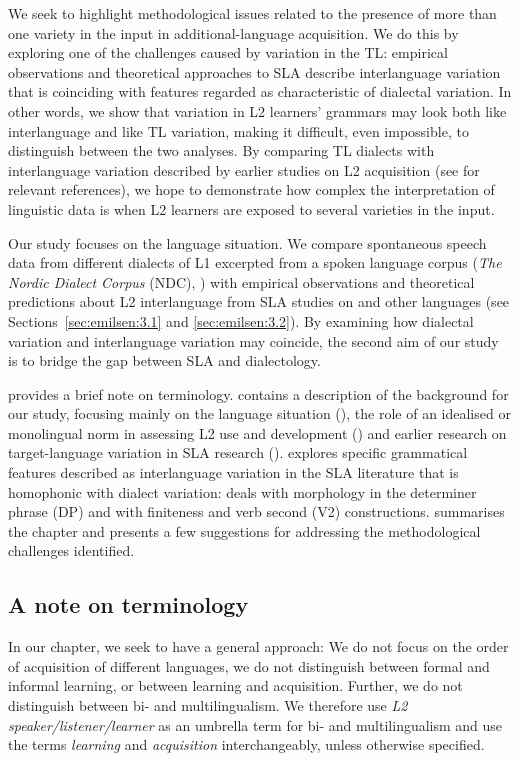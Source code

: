 \documentclass[output=paper,colorlinks,citecolor=brown,modfonts,nonflat]{../langscibook}
\begin{document}
We seek to highlight methodological issues related to the presence of more than one variety in the input in additional-language acquisition. We do this by exploring one of the challenges caused by variation in the TL: empirical observations and theoretical approaches to SLA describe interlanguage variation that is coinciding with features regarded as characteristic of dialectal variation. In other words, we show that variation in L2 learners’ grammars may look both like interlanguage and like TL variation, making it difficult, even impossible, to distinguish between the two analyses. By comparing TL dialects with interlanguage variation described by earlier studies on L2 acquisition (see  for relevant references), we hope to demonstrate how complex the interpretation of linguistic data is when L2 learners are exposed to several varieties in the input. 



Our study focuses on the  language situation. We compare spontaneous speech data from different dialects of L1  excerpted from a spoken language corpus (\textit{The Nordic Dialect Corpus} (NDC), \citealt{JohannessenEtAl2009}) with empirical observations and theoretical predictions about L2 interlanguage from SLA studies on  and other languages (see Sections~\ref{sec:emilsen:3.1} and \ref{sec:emilsen:3.2}). By examining how dialectal variation and interlanguage variation may coincide, the second aim of our study is to bridge the gap between SLA and dialectology.


 provides a brief note on terminology.  contains a description of the background for our study, focusing mainly on the  language situation (), the role of an idealised or monolingual norm in assessing L2 use and development () and earlier research on target-language variation in SLA research ().  explores specific grammatical features described as interlanguage variation in the SLA literature that is homophonic with  dialect variation:  deals with morphology in the determiner phrase (DP) and  with finiteness and verb second (V2) constructions.  summarises the chapter and presents a few suggestions for addressing the methodological challenges identified. 

\subsection{A note on terminology}\label{sec:emilsen:1.1}
In our chapter, we seek to have a general approach: We do not focus on the order of acquisition of different languages, we do not distinguish between formal and informal learning, or between learning and acquisition. Further, we do not distinguish between bi- and multilingualism. We therefore use \textit{L2 speaker/listener/learner} as an umbrella term for bi- and multilingualism and use the terms \textit{learning} and \textit{acquisition} interchangeably, unless otherwise specified.
\end{document}
